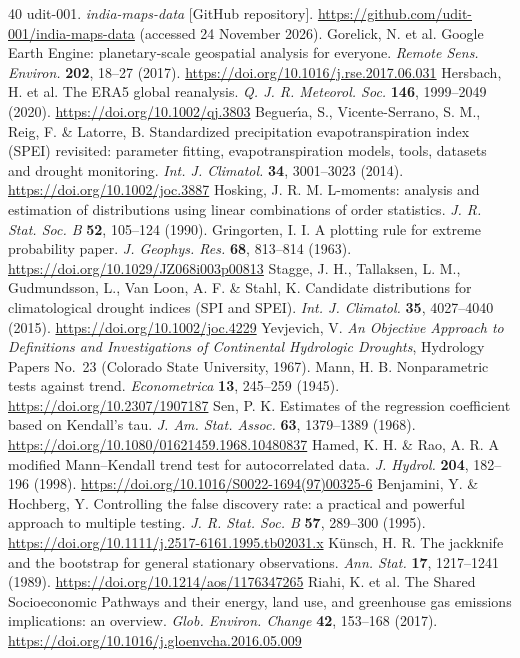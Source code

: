 \documentclass[10pt,a4paper]{article}
\begin{document}
\begin{thebibliography}{40}
 udit-001. \textit{india-maps-data} [GitHub repository]. \url{https://github.com/udit-001/india-maps-data} (accessed 24 November 2026).
 Gorelick, N. et al. Google Earth Engine: planetary-scale geospatial analysis for everyone. \textit{Remote Sens. Environ.} \textbf{202}, 18--27 (2017). \url{https://doi.org/10.1016/j.rse.2017.06.031}
 Hersbach, H. et al. The ERA5 global reanalysis. \textit{Q. J. R. Meteorol. Soc.} \textbf{146}, 1999--2049 (2020). \url{https://doi.org/10.1002/qj.3803}
 Beguer\'{\i}a, S., Vicente-Serrano, S. M., Reig, F. \& Latorre, B. Standardized precipitation evapotranspiration index (SPEI) revisited: parameter fitting, evapotranspiration models, tools, datasets and drought monitoring. \textit{Int. J. Climatol.} \textbf{34}, 3001--3023 (2014). \url{https://doi.org/10.1002/joc.3887}
 Hosking, J. R. M. L-moments: analysis and estimation of distributions using linear combinations of order statistics. \textit{J. R. Stat. Soc. B} \textbf{52}, 105--124 (1990).
 Gringorten, I. I. A plotting rule for extreme probability paper. \textit{J. Geophys. Res.} \textbf{68}, 813--814 (1963). \url{https://doi.org/10.1029/JZ068i003p00813}
 Stagge, J. H., Tallaksen, L. M., Gudmundsson, L., Van Loon, A. F. \& Stahl, K. Candidate distributions for climatological drought indices (SPI and SPEI). \textit{Int. J. Climatol.} \textbf{35}, 4027--4040 (2015). \url{https://doi.org/10.1002/joc.4229}
 Yevjevich, V. \textit{An Objective Approach to Definitions and Investigations of Continental Hydrologic Droughts}, Hydrology Papers No.~23 (Colorado State University, 1967).
 Mann, H. B. Nonparametric tests against trend. \textit{Econometrica} \textbf{13}, 245--259 (1945). \url{https://doi.org/10.2307/1907187}
 Sen, P. K. Estimates of the regression coefficient based on Kendall's tau. \textit{J. Am. Stat. Assoc.} \textbf{63}, 1379--1389 (1968). \url{https://doi.org/10.1080/01621459.1968.10480837}
 Hamed, K. H. \& Rao, A. R. A modified Mann--Kendall trend test for autocorrelated data. \textit{J. Hydrol.} \textbf{204}, 182--196 (1998). \url{https://doi.org/10.1016/S0022-1694(97)00325-6}
 Benjamini, Y. \& Hochberg, Y. Controlling the false discovery rate: a practical and powerful approach to multiple testing. \textit{J. R. Stat. Soc. B} \textbf{57}, 289--300 (1995). \url{https://doi.org/10.1111/j.2517-6161.1995.tb02031.x}
 K\"{u}nsch, H. R. The jackknife and the bootstrap for general stationary observations. \textit{Ann. Stat.} \textbf{17}, 1217--1241 (1989). \url{https://doi.org/10.1214/aos/1176347265}
 Riahi, K. et al. The Shared Socioeconomic Pathways and their energy, land use, and greenhouse gas emissions implications: an overview. \textit{Glob. Environ. Change} \textbf{42}, 153--168 (2017). \url{https://doi.org/10.1016/j.gloenvcha.2016.05.009}
\end{thebibliography}
\end{document}
